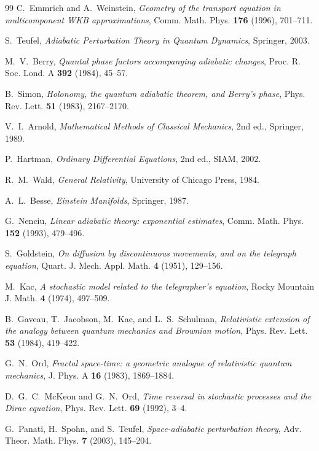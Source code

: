 \documentclass[11pt]{article}
\theoremstyle{definition}
\theoremstyle{remark}
\begin{document}
\begin{thebibliography}{99}
C.~Emmrich and A.~Weinstein,
\emph{Geometry of the transport equation in multicomponent WKB approximations},
Comm. Math. Phys. \textbf{176} (1996), 701--711.

S.~Teufel, \emph{Adiabatic Perturbation Theory in Quantum Dynamics},
Springer, 2003.

M.~V.~Berry, \emph{Quantal phase factors accompanying adiabatic changes},
Proc. R. Soc. Lond. A \textbf{392} (1984), 45--57.

B.~Simon, \emph{Holonomy, the quantum adiabatic theorem, and Berry's phase},
Phys. Rev. Lett. \textbf{51} (1983), 2167--2170.

V.~I.~Arnold, \emph{Mathematical Methods of Classical Mechanics}, 2nd ed.,
Springer, 1989.

P.~Hartman, \emph{Ordinary Differential Equations}, 2nd ed., SIAM, 2002.

R.~M.~Wald, \emph{General Relativity}, University of Chicago Press, 1984.

A.~L.~Besse, \emph{Einstein Manifolds}, Springer, 1987.

G.~Nenciu, \emph{Linear adiabatic theory: exponential estimates},
Comm. Math. Phys. \textbf{152} (1993), 479--496.

S.~Goldstein, \emph{On diffusion by discontinuous movements, and on the telegraph equation},
Quart. J. Mech. Appl. Math. \textbf{4} (1951), 129--156.

M.~Kac, \emph{A stochastic model related to the telegrapher's equation},
Rocky Mountain J. Math. \textbf{4} (1974), 497--509.

B.~Gaveau, T.~Jacobson, M.~Kac, and L.~S.~Schulman,
\emph{Relativistic extension of the analogy between quantum mechanics and
Brownian motion}, Phys. Rev. Lett. \textbf{53} (1984), 419--422.

G.~N.~Ord, \emph{Fractal space-time: a geometric analogue of relativistic
quantum mechanics}, J. Phys. A \textbf{16} (1983), 1869--1884.

D.~G.~C.~McKeon and G.~N.~Ord,
\emph{Time reversal in stochastic processes and the Dirac equation},
Phys. Rev. Lett. \textbf{69} (1992), 3--4.

G.~Panati, H.~Spohn, and S.~Teufel, \emph{Space-adiabatic perturbation theory},
Adv. Theor. Math. Phys. \textbf{7} (2003), 145--204.


\end{thebibliography}
\end{document}
